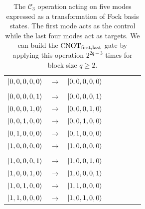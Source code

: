 \documentclass[aps,pra,twocolumn,showpacs,superscriptaddress,floatfix,10pt]{revtex4}
\begin{document}
\begin {table}[h]
\begin{center}
	\begin{tabular}{l*{6}{c}r} 
		$\ket{0,0,0,0,0}$  &  $\rightarrow$ & $\ket{0,0,0,0,0}$ \\ \\
		$\ket{0,0,0,0,1}$  & $\rightarrow$ & $\ket{0,0,0,0,1}$ \\
		$\ket{0,0,0,1,0}$ & $\rightarrow$ & $\ket{0,0,0,1,0}$ \\
		$\ket{0,0,1,0,0}$ & $\rightarrow$ & $\ket{0,0,1,0,0} $ \\ 
		$\ket{0,1,0,0,0}$ & $\rightarrow$ & $\ket{0,1,0,0,0} $\\
		$\ket{1,0,0,0,0}$ & $\rightarrow$ & $\ket{1,0,0,0,0} $ \\ \\
		$\ket{1,0,0,0,1}$  & $\rightarrow$ & $\ket{1,0,0,1,0}$ \\
		$\ket{1,0,0,1,0}$  & $\rightarrow$ & $\ket{1,0,0,0,1}$ \\
		$\ket{1,0,1,0,0}$  & $\rightarrow$ & $\ket{1,1,0,0,0}$ \\
		$\ket{1,1,0,0,0}$  & $\rightarrow$ & $\ket{1,0,1,0,0}$ \\
	\end{tabular}
	\caption{ \label{One Control Four Targets} The $\mathcal{C}_3$ operation acting on five modes expressed as a transformation of Fock basis states. The first mode acts as the control while the last four modes act as targets. We can build the $\mbox{CNOT}_{\rm first,last}$ gate by applying this operation $2^{2 q - 3}$ times for block size $q \ge 2$.}
\end{center}
\end{table}
\end{document}
